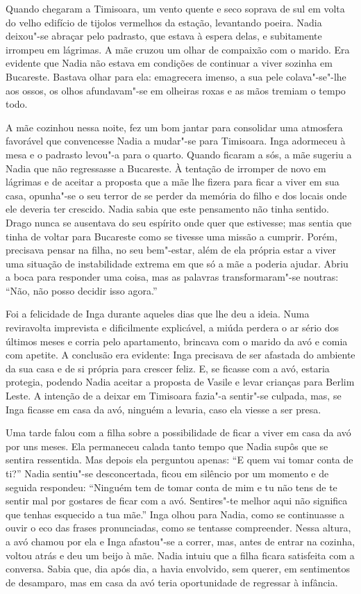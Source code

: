 Quando chegaram a Timisoara, um vento quente e seco soprava de sul em
volta do velho edifício de tijolos vermelhos da estação, levantando
poeira. Nadia deixou"-se abraçar pelo padrasto, que estava à espera
delas, e subitamente irrompeu em lágrimas. A mãe cruzou um olhar de compaixão com o marido. Era evidente que Nadia não estava em condições de
continuar a viver sozinha em Bucareste. Bastava olhar para ela:
emagrecera imenso, a sua pele colava"-se"-lhe aos ossos, os olhos
afundavam"-se em olheiras roxas e as mãos tremiam o tempo todo.

A mãe cozinhou nessa noite, fez um bom jantar para consolidar uma
atmosfera favorável que convencesse Nadia a mudar"-se para Timisoara.
Inga adormeceu à mesa e o padrasto levou"-a para o quarto. Quando ficaram
a sós, a mãe sugeriu a Nadia que não regressasse a Bucareste. À tentação de irromper de novo em lágrimas e de aceitar a proposta que a
mãe lhe fizera para ficar a viver em sua casa, opunha"-se o seu terror de
se perder da memória do filho e dos locais onde ele deveria ter
crescido. Nadia sabia que este pensamento não tinha sentido. Drago nunca
se ausentava do seu espírito onde quer que estivesse; mas sentia que
tinha de voltar para Bucareste como se tivesse uma missão a cumprir.
Porém, precisava pensar na filha, no seu bem"-estar, além de ela
própria estar a viver uma situação de instabilidade extrema em que só a
mãe a poderia ajudar. Abriu a boca para responder uma coisa, mas as
palavras transformaram"-se noutras: ``Não, não posso decidir isso
agora.''

Foi a felicidade de Inga durante aqueles dias que lhe deu a ideia. Numa
reviravolta imprevista e dificilmente explicável, a miúda perdera o ar
sério dos últimos meses e corria pelo apartamento, brincava com o marido
da avó e comia com apetite. A conclusão era evidente: Inga precisava
de ser afastada do ambiente da sua casa e de si própria para crescer
feliz. E, se ficasse com a avó, estaria protegia, podendo Nadia aceitar
a proposta de Vasile e levar crianças para Berlim Leste. A intenção de a
deixar em Timisoara fazia"-a sentir"-se culpada, mas, se Inga ficasse em
casa da avó, ninguém a levaria, caso ela viesse a ser presa.

Uma tarde
falou com a filha sobre a possibilidade de ficar a viver em casa da avó
por uns meses. Ela permaneceu calada tanto tempo que Nadia supôs que se
sentira ressentida. Mas depois ela perguntou apenas: ``E quem vai tomar
conta de ti?'' Nadia sentiu"-se desconcertada, ficou em silêncio por um
momento e de seguida respondeu: ``Ninguém tem de tomar conta de mim e
tu não tens de te sentir mal por gostares de ficar com a avó.
Sentires"-te melhor aqui não significa que tenhas esquecido a tua mãe.''
Inga olhou para Nadia, como se continuasse a ouvir o eco das frases
pronunciadas, como se tentasse compreender. Nessa altura, a avó chamou
por ela e Inga afastou"-se a correr, mas, antes de entrar na cozinha,
voltou atrás e deu um beijo à mãe. Nadia intuiu que a filha ficara
satisfeita com a conversa. Sabia que, dia após dia, a havia envolvido,
sem querer, em sentimentos de desamparo, mas em casa da avó
teria oportunidade de regressar à infância.

